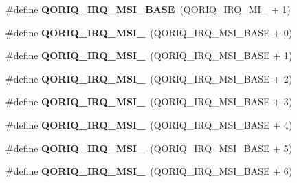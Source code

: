 \begin{DoxyCompactItemize}
\item 
\mbox{\label{group__QoriqInterruptIPI_ga5bbb811e2c69adb891329a207a68c17b}} 
\#define {\bfseries Q\+O\+R\+I\+Q\+\_\+\+I\+R\+Q\+\_\+\+M\+S\+I\+\_\+\+B\+A\+SE}~(Q\+O\+R\+I\+Q\+\_\+\+I\+R\+Q\+\_\+\+M\+I\+\_ + 1)
\item 
\mbox{\label{group__QoriqInterruptIPI_gadf4bfaf8a875dbc0611d79e4120262f2}} 
\#define {\bfseries Q\+O\+R\+I\+Q\+\_\+\+I\+R\+Q\+\_\+\+M\+S\+I\+\_}~(Q\+O\+R\+I\+Q\+\_\+\+I\+R\+Q\+\_\+\+M\+S\+I\+\_\+\+B\+A\+SE + 0)
\item 
\mbox{\label{group__QoriqInterruptIPI_ga0188096b0591384ad6bac42b55e10953}} 
\#define {\bfseries Q\+O\+R\+I\+Q\+\_\+\+I\+R\+Q\+\_\+\+M\+S\+I\+\_}~(Q\+O\+R\+I\+Q\+\_\+\+I\+R\+Q\+\_\+\+M\+S\+I\+\_\+\+B\+A\+SE + 1)
\item 
\mbox{\label{group__QoriqInterruptIPI_gae628a2a98dc9a75cc4256052ecd58ed5}} 
\#define {\bfseries Q\+O\+R\+I\+Q\+\_\+\+I\+R\+Q\+\_\+\+M\+S\+I\+\_}~(Q\+O\+R\+I\+Q\+\_\+\+I\+R\+Q\+\_\+\+M\+S\+I\+\_\+\+B\+A\+SE + 2)
\item 
\mbox{\label{group__QoriqInterruptIPI_ga784e2e5d56516ed60635754b99f85ed8}} 
\#define {\bfseries Q\+O\+R\+I\+Q\+\_\+\+I\+R\+Q\+\_\+\+M\+S\+I\+\_}~(Q\+O\+R\+I\+Q\+\_\+\+I\+R\+Q\+\_\+\+M\+S\+I\+\_\+\+B\+A\+SE + 3)
\item 
\mbox{\label{group__QoriqInterruptIPI_ga5259b11d70a123d1042b737f7cad8926}} 
\#define {\bfseries Q\+O\+R\+I\+Q\+\_\+\+I\+R\+Q\+\_\+\+M\+S\+I\+\_}~(Q\+O\+R\+I\+Q\+\_\+\+I\+R\+Q\+\_\+\+M\+S\+I\+\_\+\+B\+A\+SE + 4)
\item 
\mbox{\label{group__QoriqInterruptIPI_ga1a2970ee26ca3554a6d7b221f2352faf}} 
\#define {\bfseries Q\+O\+R\+I\+Q\+\_\+\+I\+R\+Q\+\_\+\+M\+S\+I\+\_}~(Q\+O\+R\+I\+Q\+\_\+\+I\+R\+Q\+\_\+\+M\+S\+I\+\_\+\+B\+A\+SE + 5)
\item 
\mbox{\label{group__QoriqInterruptIPI_ga4d132e1d666b2f602a06a0d4b30f59c2}} 
\#define {\bfseries Q\+O\+R\+I\+Q\+\_\+\+I\+R\+Q\+\_\+\+M\+S\+I\+\_}~(Q\+O\+R\+I\+Q\+\_\+\+I\+R\+Q\+\_\+\+M\+S\+I\+\_\+\+B\+A\+SE + 6)

\end{DoxyCompactItemize}

